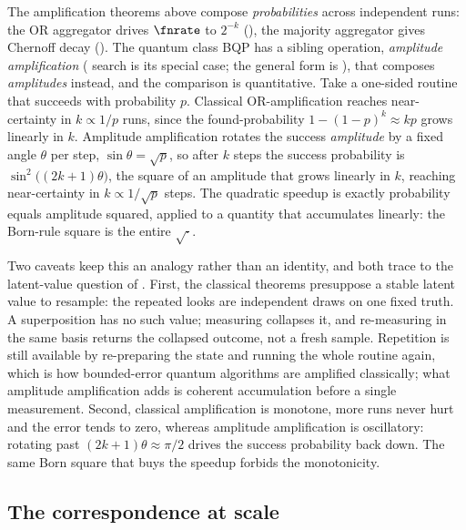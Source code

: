 \begin{remark}
\label{rem:quantum-amplification}
The amplification theorems above compose \emph{probabilities} across independent
runs: the OR aggregator drives $\fnrate$ to $2^{-k}$
(), the majority aggregator gives Chernoff decay
(). The quantum class BQP has a sibling operation,
\emph{amplitude amplification}
(\textcite{grover-1996} search is its special case; the general form is
\parencite{brassard-2002}), that composes \emph{amplitudes} instead, and the
comparison is quantitative. Take a one-sided routine
that succeeds with probability $p$. Classical OR-amplification reaches
near-certainty in $k \propto 1/p$ runs, since the found-probability
$1 - (1 - p)^k \approx kp$ grows linearly in $k$. Amplitude amplification rotates
the success \emph{amplitude} by a fixed angle $\theta$ per step,
$\sin\theta = \sqrt{p}$, so after $k$ steps the success probability is
$\sin^2\!\big((2k+1)\theta\big)$, the square of an amplitude that grows linearly
in $k$, reaching near-certainty in $k \propto 1/\sqrt{p}$ steps. The quadratic
speedup is exactly probability equals amplitude squared, applied to a quantity
that accumulates linearly: the Born-rule square is the entire $\sqrt{\cdot}$.

Two caveats keep this an analogy rather than an identity, and both trace to the
latent-value question of . First, the classical
theorems presuppose a stable latent value to resample: the repeated looks are
independent draws on one fixed truth. A superposition has no such value;
measuring collapses it, and re-measuring in the same basis returns the
collapsed outcome, not a fresh sample. Repetition is still available by
re-preparing the state and running the whole routine again, which is how
bounded-error quantum algorithms are amplified classically; what amplitude
amplification adds is coherent accumulation before a single measurement. Second, classical
amplification is monotone, more runs never hurt and the error tends to zero,
whereas amplitude amplification is oscillatory: rotating past
$(2k+1)\theta \approx \pi/2$ drives the success probability back down. The same
Born square that buys the speedup forbids the monotonicity.
\end{remark}

\subsection*{The correspondence at scale}

